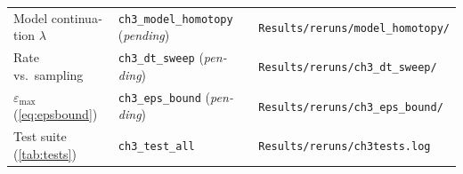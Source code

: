 \documentclass[10pt,twocolumn]{article}
\begin{document}
\begin{latin}
\begin{tabular}{p{}p{}p{}}
    Model continuation $\lambda$ &
        \texttt{ch3\_model\_homotopy} (\emph{pending}) & \texttt{Results/reruns/model\_homotopy/} \\
    Rate vs.\ sampling &
        \texttt{ch3\_dt\_sweep} (\emph{pending}) & \texttt{Results/reruns/ch3\_dt\_sweep/} \\
    $\varepsilon_{\max}$ (\ref{eq:epsbound}) &
        \texttt{ch3\_eps\_bound} (\emph{pending}) & \texttt{Results/reruns/ch3\_eps\_bound/} \\
    Test suite (\ref{tab:tests}) &
        \texttt{ch3\_test\_all} & \texttt{Results/reruns/ch3tests.log} \\
    \bottomrule
\end{tabular}
\end{latin}
\end{document}
